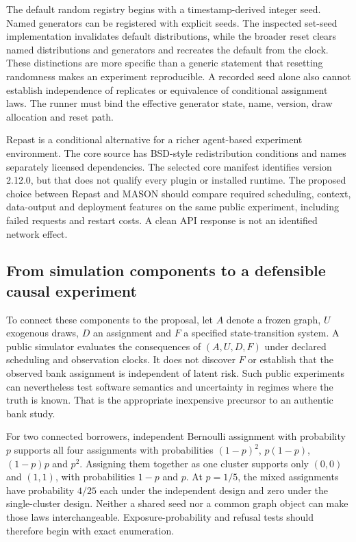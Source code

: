 The default random registry begins with a timestamp-derived integer seed. Named generators can be registered with explicit seeds. The inspected set-seed implementation invalidates default distributions, while the broader reset clears named distributions and generators and recreates the default from the clock. These distinctions are more specific than a generic statement that resetting randomness makes an experiment reproducible. A recorded seed alone also cannot establish independence of replicates or equivalence of conditional assignment laws. The runner must bind the effective generator state, name, version, draw allocation and reset path.~\citep{exec25_jnet_repast}

Repast is a conditional alternative for a richer agent-based experiment environment. The core source has BSD-style redistribution conditions and names separately licensed dependencies. The selected core manifest identifies version 2.12.0, but that does not qualify every plugin or installed runtime. The proposed choice between Repast and MASON should compare required scheduling, context, data-output and deployment features on the same public experiment, including failed requests and restart costs. A clean API response is not an identified network effect.~\citep{exec25_jnet_repast,exec25_jnet_choice}

\subsection{From simulation components to a defensible causal experiment}

To connect these components to the proposal, let $A$ denote a frozen graph, $U$ exogenous draws, $D$ an assignment and $F$ a specified state-transition system. A public simulator evaluates the consequences of $(A,U,D,F)$ under declared scheduling and observation clocks. It does not discover $F$ or establish that the observed bank assignment is independent of latent risk. Such public experiments can nevertheless test software semantics and uncertainty in regimes where the truth is known. That is the appropriate inexpensive precursor to an authentic bank study.~\citep{exec25_jnet_choice}

For two connected borrowers, independent Bernoulli assignment with probability $p$ supports all four assignments with probabilities $(1-p)^2$, $p(1-p)$, $(1-p)p$ and $p^2$. Assigning them together as one cluster supports only $(0,0)$ and $(1,1)$, with probabilities $1-p$ and $p$. At $p=1/5$, the mixed assignments have probability $4/25$ each under the independent design and zero under the single-cluster design. Neither a shared seed nor a common graph object can make those laws interchangeable. Exposure-probability and refusal tests should therefore begin with exact enumeration.~\citep{exec25_jnet_choice}

